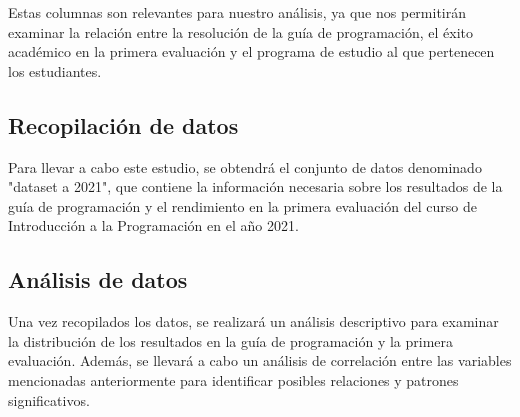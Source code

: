 \vfill
Estas columnas son relevantes para nuestro análisis, ya que nos permitirán examinar la relación entre la resolución de la guía de programación,
el éxito académico en la primera evaluación y el programa de estudio al que pertenecen los estudiantes.

\vfill
\subsection*{Recopilación de datos}

Para llevar a cabo este estudio, se obtendrá el conjunto de datos denominado "dataset a 2021", que contiene la información necesaria sobre los
resultados de la guía de programación y el rendimiento en la primera evaluación del curso de Introducción a la Programación en el año 2021.

\vfill
\subsection*{Análisis de datos}

Una vez recopilados los datos, se realizará un análisis descriptivo para examinar la distribución de los resultados en la guía de programación y
la primera evaluación. Además, se llevará a cabo un análisis de correlación entre las variables mencionadas anteriormente para identificar posibles
relaciones y patrones significativos.
\vfill